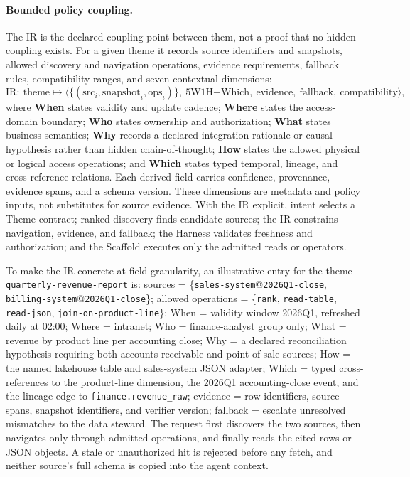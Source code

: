 \documentclass[11pt]{article}
\begin{document}
\paragraph{Bounded policy coupling.}
The IR is the declared coupling point between them, not a proof that no hidden coupling exists. For a given theme it records source identifiers and snapshots, allowed discovery and navigation operations, evidence requirements, fallback rules, compatibility ranges, and seven contextual dimensions:
\begin{equation}
\mathrm{IR}:\ \mathrm{theme} \mapsto \langle \{(\mathrm{src}_i,\mathrm{snapshot}_i,\mathrm{ops}_i)\},\ \mathrm{5W1H}\mathrm{+}\mathrm{Which},\ \mathrm{evidence},\ \mathrm{fallback},\ \mathrm{compatibility} \rangle,
\end{equation}
where \textbf{When} states validity and update cadence; \textbf{Where} states the access-domain boundary; \textbf{Who} states ownership and authorization; \textbf{What} states business semantics; \textbf{Why} records a declared integration rationale or causal hypothesis rather than hidden chain-of-thought; \textbf{How} states the allowed physical or logical access operations; and \textbf{Which} states typed temporal, lineage, and cross-reference relations. Each derived field carries confidence, provenance, evidence spans, and a schema version. These dimensions are metadata and policy inputs, not substitutes for source evidence. With the IR explicit, intent selects a Theme contract; ranked discovery finds candidate sources; the IR constrains navigation, evidence, and fallback; the Harness validates freshness and authorization; and the Scaffold executes only the admitted reads or operators.

To make the IR concrete at field granularity, an illustrative entry for the theme \texttt{quarterly-revenue-report} is: sources = \{\texttt{sales-system}@\texttt{2026Q1-close}, \texttt{billing-system}@\texttt{2026Q1-close}\}; allowed operations = \{\texttt{rank}, \texttt{read-table}, \texttt{read-json}, \texttt{join-on-product-line}\}; When = validity window 2026Q1, refreshed daily at 02:00; Where = intranet; Who = finance-analyst group only; What = revenue by product line per accounting close; Why = a declared reconciliation hypothesis requiring both accounts-receivable and point-of-sale sources; How = the named lakehouse table and sales-system JSON adapter; Which = typed cross-references to the product-line dimension, the 2026Q1 accounting-close event, and the lineage edge to \texttt{finance.revenue\_raw}; evidence = row identifiers, source spans, snapshot identifiers, and verifier version; fallback = escalate unresolved mismatches to the data steward. The request first discovers the two sources, then navigates only through admitted operations, and finally reads the cited rows or JSON objects. A stale or unauthorized hit is rejected before any fetch, and neither source's full schema is copied into the agent context.
\end{document}
